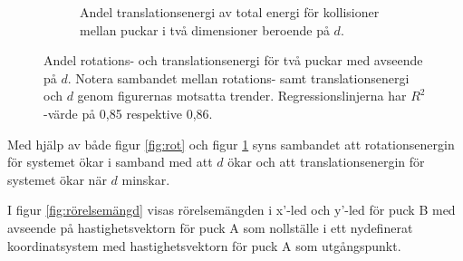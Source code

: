 \begin{figure}[H]
\begin{subfigure}{.48\textwidth}
        \caption{Andel  translationsenergi av total energi för kollisioner mellan puckar i två dimensioner beroende på $d$.}
        \label{fig:trans}
    \end{subfigure}
    \caption{Andel rotations- och translationsenergi för två puckar med avseende på $d$. Notera sambandet mellan rotations- samt translationsenergi och $d$ genom figurernas motsatta trender. Regressionslinjerna har $R^2$-värde på 0,85 respektive 0,86.}
    \label{fig:energifördl}
\end{figure}

Med hjälp av både figur \ref{fig:rot} och figur \ref{fig:trans} syns sambandet att rotationsenergin för systemet ökar i samband med att $d$ ökar och att translationsenergin för systemet ökar när $d$ minskar.

I figur \ref{fig:rörelsemängd} visas rörelsemängden i x'-led och y'-led för puck B med avseende på hastighetsvektorn för puck A som nollställe i ett nydefinerat koordinatsystem med hastighetsvektorn för puck A som utgångspunkt.

